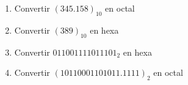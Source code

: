 \documentclass[a4paper,11pt]{article}
\begin{document}
\begin{enumerate}
\item Convertir $(345.158 )_{10}$ en octal\\


\item Convertir $(389)_{10}$ en hexa\\
%

\item { Convertir $011001111011101_2$ en hexa}
%
%



\item { Convertir $(10110001101011.1111 )_2$ en octal}



\end{enumerate}
\end{document}
